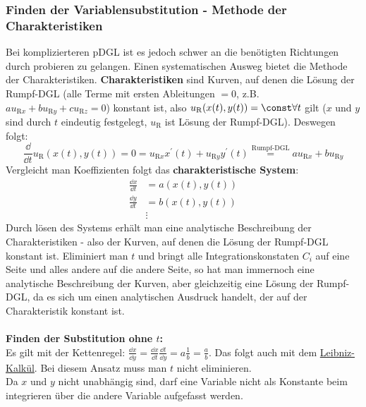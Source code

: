 \subsubsection{Finden der Variablensubstitution - Methode der Charakteristiken}
Bei komplizierteren pDGL ist es jedoch schwer an die benötigten Richtungen durch probieren zu gelangen. Einen systematischen Ausweg bietet die Methode der Charakteristiken. \textbf{Charakteristiken} sind Kurven, auf denen die Lösung der Rumpf-DGL (alle Terme mit ersten Ableitungen $=0$, z.B. $au_{\mathrm{R}x}+bu_{\mathrm{R}y}+cu_{\mathrm{R}z}=0$) konstant ist, also $u_{\mathrm{R}}(x(t),y(t))=\const\forall t$ gilt ($x$ und $y$ sind durch $t$ eindeutig festgelegt, $u_{\mathrm{R}}$ ist Lösung der Rumpf-DGL). Deswegen folgt:
\begin{equation}
	\frac{\dd}{\dd t} u_{\mathrm{R}}(x(t),y(t)) =0=u_{\mathrm{R}x}x^\prime(t)+u_{\mathrm{R}y}y^\prime(t)\stackrel{\text{Rumpf-DGL}}{=}au_{\mathrm{R}x}+bu_{\mathrm{R}y}
\end{equation}
Vergleicht man Koeffizienten folgt das \textbf{charakteristische System}:
\begin{equation}
	\begin{split}
	\frac{\dd x}{\dd t}&=a(x(t),y(t))\\
	\frac{\dd y}{\dd t}&=b(x(t),y(t))\\
	&\vdots
	\end{split}
\end{equation}
Durch lösen des Systems erhält man eine analytische Beschreibung der Charakteristiken - also der Kurven, auf denen die Lösung der Rumpf-DGL konstant ist. Eliminiert man $t$ und bringt alle Integrationskonstaten $C_i$ auf eine Seite und alles andere auf die andere Seite, so hat man immernoch eine analytische Beschreibung der Kurven, aber gleichzeitig eine Lösung der Rumpf-DGL, da es sich um einen analytischen Ausdruck handelt, der auf der Charakteristik konstant ist.\\\\
\textbf{Finden der Substitution ohne $t$:}\\
Es gilt mit der Kettenregel: $\frac{\dd x}{\dd y}=\frac{\dd x}{\dd t}\frac{\dd t}{\dd y}=a\frac{1}{b}=\frac{a}{b}$. Das folgt auch mit dem \href{https://homepage.ruhr-uni-bochum.de/lukas.steenvoort/docs/analysis/differentiale.pdf}{Leibniz-Kalkül}. Bei diesem Ansatz muss man $t$ nicht eliminieren. \\
Da $x$ und $y$ nicht unabhängig sind, darf eine Variable nicht als Konstante beim integrieren über die andere Variable aufgefasst werden. 
